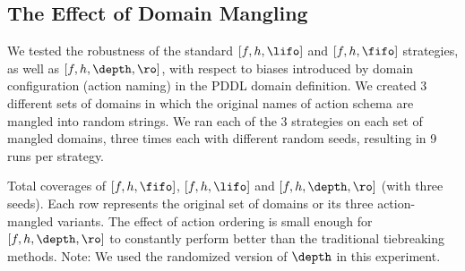 \subsection{The Effect of Domain Mangling}

\label{sec:mangling}


We tested the robustness of the standard $[f,h,\lifo]$ and $[f,h,\fifo]$ strategies, as well as $[f,h,\depth,\ro]$,
with respect to 
biases introduced by domain configuration (action naming) in the PDDL domain definition.
We created 3 different sets of domains in which the
original names of action schema are mangled into random strings. 
We ran each of the 3 strategies on each
set of mangled domains, three times each with different random seeds,
resulting in 9 runs per strategy.

\begin{table}[htbp]
 \centering {}
 
 \caption{Total coverages of $[f,h,\fifo]$, $[f,h,\lifo]$
 and $[f,h,\depth,\ro]$ (with three seeds). Each row represents the original set of
 domains or its three action-mangled variants. The effect
 of action ordering is small enough for $[f,h,\depth,\ro]$ to
 constantly perform better than the traditional tiebreaking methods.
Note: We used the randomized version of $\depth$ in this experiment.
}
 \label{actionordering-robustness}
\end{table}

